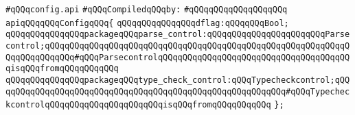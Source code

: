 \label{src/lib/c-kit/src/variants/config.api}
\verb|#qQQqconfig.api|\newline
\newline
\verb|#qQQqCompiledqQQqby:|\newline
\verb|#qQQqqQQqqQQqqQQqqQQq|\newline
\newline
\verb|apiqQQqqQQqConfigqQQq{|\newline
\newline
\verb|qQQqqQQqqQQqqQQqdflag:qQQqqQQqBool;|\newline
\newline
\verb|qQQqqQQqqQQqqQQqpackageqQQqparse_control:qQQqqQQqqQQqqQQqqQQqqQQqParsecontrol;qQQqqQQqqQQqqQQqqQQqqQQqqQQqqQQqqQQqqQQqqQQqqQQqqQQqqQQqqQQqqQQqqQQqqQQqqQQq#qQQqParsecontrolqQQqqQQqqQQqqQQqqQQqqQQqqQQqqQQqqQQqqQQqisqQQqfromqQQqqQQqqQQq|\newline
\verb|qQQqqQQqqQQqqQQqpackageqQQqtype_check_control:qQQqTypecheckcontrol;qQQqqQQqqQQqqQQqqQQqqQQqqQQqqQQqqQQqqQQqqQQqqQQqqQQqqQQqqQQq#qQQqTypecheckcontrolqQQqqQQqqQQqqQQqqQQqqQQqisqQQqfromqQQqqQQqqQQq|\newline
\verb|};|\newline

